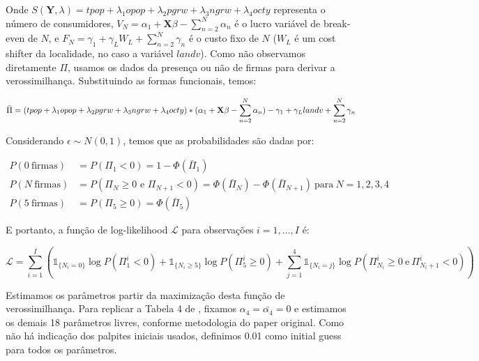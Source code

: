 \documentclass{article}
\begin{document}
Onde $S(\mathbf{Y}, \lambda) = tpop + \lambda_1 opop + \lambda_2 pgrw + \lambda_3 ngrw + \lambda_4 octy$ representa o número de consumidores, $V_{N}=\alpha_{1}+\mathbf{X} \beta-\sum_{n=2}^{N} \alpha_{n}$ é o lucro variável de break-even de $N$, e $F_{N}=\gamma_{1}+\gamma_{L} W_{L}+\sum_{n=2}^{N} \gamma_{n}$ é o custo fixo de $N$ ($W_L$ é um cost shifter da localidade, no caso a variável $landv$). Como não observamos diretamente $\Pi$, usamos os dados da presença ou não de firmas para derivar a verossimilhança. Substituindo as formas funcionais, temos:

\begin{equation*}
    \Bar{\Pi} = (tpop + \lambda_1 opop + \lambda_2 pgrw + \lambda_3 ngrw + \lambda_4 octy) * (\alpha_{1}+\mathbf{X} \beta-\sum_{n=2}^{N} \alpha_{n}) - \gamma_{1}+\gamma_{L} landv+\sum_{n=2}^{N} \gamma_{n}
\end{equation*}



Considerando $\epsilon \sim N(0,1)$, temos que as probabilidades são dadas por:

\begin{equation*}
\begin{aligned}
    P(0 \: \text{firmas}) &= P(\Pi_{1}<0) = 1-\Phi({\bar{\Pi}}_{1}) \\
    P(N \: \text{firmas}) &= P(\Pi_{N} \geq 0 \text { e } \Pi_{N+1}<0) = \Phi\left(\bar{\Pi}_{N}\right)-\Phi\left(\bar{\Pi}_{N+1}\right)\: \text{para}\: N = 1, 2, 3, 4 \\ 
    P(5 \: \text{firmas}) &= P(\Pi_{5} \geq 0) = \Phi(\bar{\Pi}_{5})
\end{aligned}
\end{equation*}

E portanto, a função de log-likelihood $\mathcal{L}$ para observações $i = 1, ..., I$ é:

\begin{equation*}
    \mathcal{L}=\sum\limits_{i=1}^I\left(\mathds{1}_{\{N_i=0\}}\log P\left(\Pi^i_1<0\right)+\mathds{1}_{\{N_i\geq5\}}\log P\left(\Pi^i_5\geq0\right)+\sum\limits_{j=1}^4 \mathds{1}_{\{N_i=j\}}\log P\left(\Pi^i_{N_i}\geq0\:\text{e}\:\Pi^i_{N_i+1}<0\right)\right)
\end{equation*}

Estimamos os parâmetros partir da maximização desta função de verossimilhança. Para replicar a Tabela 4 de , fixamos $\alpha_4 = \bar{\alpha_4} = 0$ e estimamos os demais 18 parâmetros livres, conforme metodologia do paper original. Como não há indicação dos palpites iniciais usados, definimos 0.01 como initial guess para todos os parâmetros.
\end{document}
